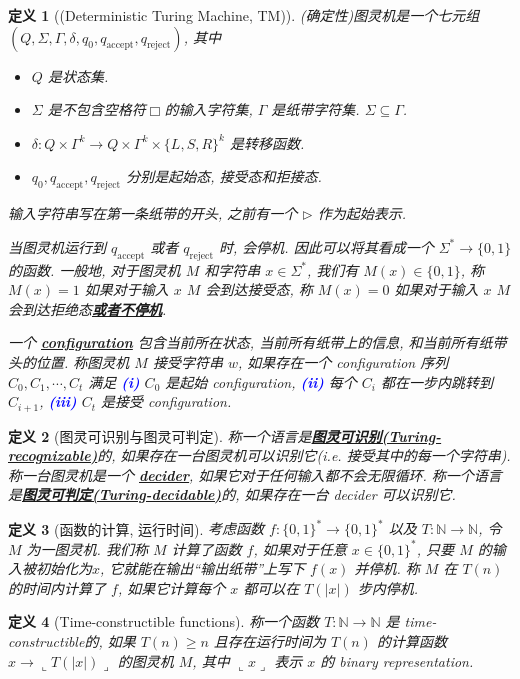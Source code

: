 \documentclass[8pt]{article}
\theoremstyle{compact}
\newtheorem{definition}{定义}
\def\obj#1{\textbf{\uline{#1}}}
\def\num#1{\textnormal{\textbf{\mbox{\textcolor{blue}{(#1)}}}}}
\def\ge{\geqslant}
\def\rep#1{\llcorner{#1}\lrcorner}
\begin{document}
\begin{definition}[(Deterministic Turing Machine, TM)]
	(确定性)图灵机是一个七元组 $(Q, \Sigma, \Gamma, \delta, q_0, q_{\text{accept}}, q_{\text{reject}})$, 其中
	\begin{itemize}
		\item $Q$ 是状态集.
		\item $\Sigma$ 是不包含空格符$\Box$的输入字符集, $\Gamma$ 是纸带字符集. $\Sigma \subseteq \Gamma$.
		\item $\delta: Q \times \Gamma^k \to Q \times \Gamma^k \times \{L, S, R\}^k$ 是转移函数.
		\item $q_0, q_{\text{accept}}, q_{\text{reject}}$ 分别是起始态, 接受态和拒接态.
	\end{itemize}

	输入字符串写在第一条纸带的开头, 之前有一个 $\triangleright$ 作为起始表示.

	当图灵机运行到 $q_{\text{accept}}$ 或者 $q_{\text{reject}}$ 时, 会停机. 因此可以将其看成一个 $\Sigma^* \to \{0, 1\}$ 的函数. 一般地, 对于图灵机 $M$ 和字符串 $x \in \Sigma^*$, 我们有 $M(x) \in \{0, 1\}$, 称 $M(x) = 1$ 如果对于输入 $x$ $M$ 会到达接受态, 称 $M(x) = 0$ 如果对于输入 $x$ $M$ 会到达拒绝态\obj{或者不停机}.

	一个 \obj{configuration} 包含当前所在状态, 当前所有纸带上的信息, 和当前所有纸带头的位置. 称图灵机 $M$ 接受字符串 $w$, 如果存在一个 configuration 序列 $C_0, C_1, \cdots, C_t$ 满足 \num{i} $C_0$ 是起始 configuration, \num{ii} 每个 $C_i$ 都在一步内跳转到 $C_{i+1}$, \num{iii} $C_t$ 是接受 configuration.
\end{definition}
\begin{definition}[图灵可识别与图灵可判定]
	称一个语言是\obj{图灵可识别(Turing-recognizable)}的, 如果存在一台图灵机可以识别它(i.e. 接受其中的每一个字符串). 称一台图灵机是一个 \obj{decider}, 如果它对于任何输入都不会无限循环. 称一个语言是\obj{图灵可判定(Turing-decidable)}的, 如果存在一台 decider 可以识别它.
\end{definition}
\begin{definition}[函数的计算, 运行时间]
	考虑函数 $f: \{0,  1\}^* \to \{0, 1\}^*$ 以及 $T: \mathbb{N} \to \mathbb{N}$, 令 $M$ 为一图灵机. 我们称 $M$ 计算了函数 $f$, 如果对于任意 $x \in \{0, 1\}^*$, 只要 $M$ 的输入被初始化为$x$, 它就能在输出“输出纸带”上写下 $f(x)$ 并停机. 称 $M$ 在 $T(n)$ 的时间内计算了 $f$, 如果它计算每个 $x$ 都可以在 $T(|x|)$ 步内停机.
\end{definition}
\begin{definition}[Time-constructible functions]
	称一个函数 $T: \mathbb N \to \mathbb N$ 是 time-constructible的, 如果 $T(n) \ge n$ 且存在运行时间为 $T(n)$ 的计算函数 $x \to \rep{T(|x|)}$ 的图灵机 $M$, 其中 $\rep{x}$ 表示 $x$ 的 binary representation.
\end{definition}
\end{document}

